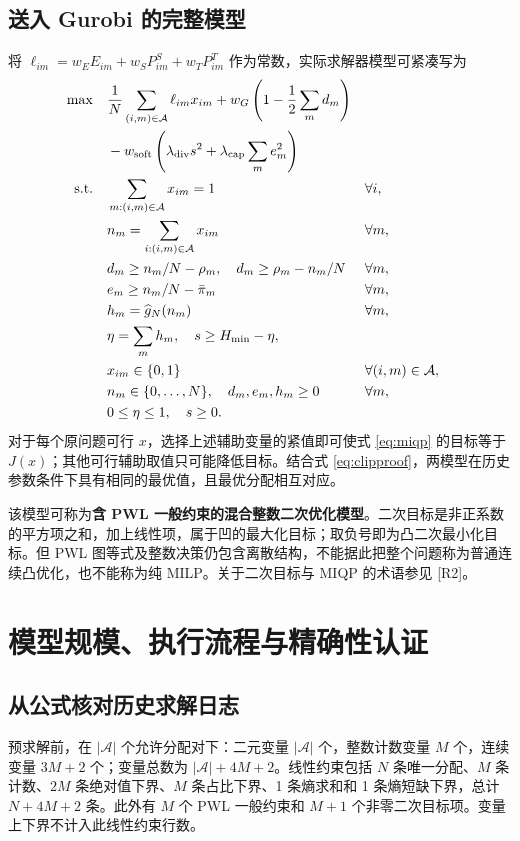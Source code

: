 \documentclass[UTF8,11pt,a4paper,fontset=fandol]{ctexart}
\newcommand{\A}{\mathcal A}
\begin{document}
\subsection{送入 Gurobi 的完整模型}
将 $\ell_{im}=w_EE_{im}+w_SP^S_{im}+w_TP^T_{im}$ 作为常数，实际求解器模型可紧凑写为
\begin{align}
 \max\quad &\frac1N\sum_{(i,m)\in\A}\ell_{im}x_{im}
       +w_G\left(1-\frac12\sum_m d_m\right)\notag\\
       &{}-w_{\mathrm{soft}}\left(\lambda_{\mathrm{div}}s^2+
                      \lambda_{\mathrm{cap}}\sum_m e_m^2\right) \label{eq:miqp}\\
 \text{s.t.}\quad
 &\sum_{m:(i,m)\in\A}x_{im}=1 &&\forall i,\notag\\
 &n_m=\sum_{i:(i,m)\in\A}x_{im} &&\forall m,\notag\\
 &d_m\ge n_m/N-\rho_m,\quad d_m\ge\rho_m-n_m/N &&\forall m,\notag\\
 &e_m\ge n_m/N-\bar\pi_m &&\forall m,\notag\\
 &h_m=\widehat g_N(n_m) &&\forall m,\notag\\
 &\eta=\sum_mh_m,\quad s\ge H_{\min}-\eta,\notag\\
 &x_{im}\in\{0,1\} &&\forall(i,m)\in\A,\notag\\
 &n_m\in\{0,\ldots,N\},\quad d_m,e_m,h_m\ge0 &&\forall m,\notag\\
 &0\le\eta\le1,\quad s\ge0.\notag
\end{align}
对于每个原问题可行 $x$，选择上述辅助变量的紧值即可使式 \eqref{eq:miqp} 的目标等于 $J(x)$；其他可行辅助取值只可能降低目标。结合式 \eqref{eq:clipproof}，两模型在历史参数条件下具有相同的最优值，且最优分配相互对应。

该模型可称为\textbf{含 PWL 一般约束的混合整数二次优化模型}。二次目标是非正系数的平方项之和，加上线性项，属于凹的最大化目标；取负号即为凸二次最小化目标。但 PWL 图等式及整数决策仍包含离散结构，不能据此把整个问题称为普通连续凸优化，也不能称为纯 MILP。关于二次目标与 MIQP 的术语参见 [R2]。

\section{模型规模、执行流程与精确性认证}
\subsection{从公式核对历史求解日志}
预求解前，在 $|\A|$ 个允许分配对下：二元变量 $|\A|$ 个，整数计数变量 $M$ 个，连续变量 $3M+2$ 个；变量总数为 $|\A|+4M+2$。线性约束包括 $N$ 条唯一分配、$M$ 条计数、$2M$ 条绝对值下界、$M$ 条占比下界、1 条熵求和和 1 条熵短缺下界，总计 $N+4M+2$ 条。此外有 $M$ 个 PWL 一般约束和 $M+1$ 个非零二次目标项。变量上下界不计入此线性约束行数。
\end{document}
